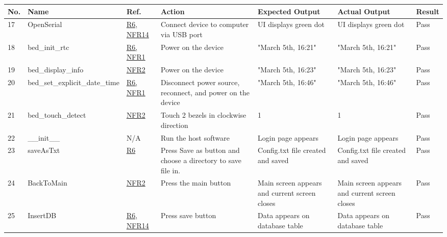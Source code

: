 \documentclass[12pt, titlepage]{article}
\begin{document}
\begin{center}
\begin{table} [H]
\begin{tabular}{ | p{0.5cm} | p{2.8cm} |  p{1.1cm} | p{2.7cm} | p{2.7cm} | p{2.7cm} | p{1.1cm} |}
\hline
\textbf{No.} & \textbf{Name}  & \textbf{Ref.} & \textbf{Action} & \textbf{Expected Output} & \textbf{Actual \newline Output} & \textbf{Result} \\
\hline
17 & OpenSerial & \href{https://github.com/zakerl/Capstone_Project/blob/main/docs/SRS/SRS.pdf}{R6, NFR14} & Connect device to computer via USB port & UI displays green dot & UI displays green dot & Pass \\ 
\hline
18 & bed\_init\_rtc & \href{https://github.com/zakerl/Capstone_Project/blob/main/docs/SRS/SRS.pdf}{R6, NFR1} & Power on the device & "March 5th, 16:21" & "March 5th, 16:21" & Pass \\ 
\hline
19 & bed\_display\_info & \href{https://github.com/zakerl/Capstone_Project/blob/main/docs/SRS/SRS.pdf}{NFR2} & Power on the device & "March 5th, 16:23" & "March 5th, 16:23" & Pass \\ 
\hline
20 & bed\_set\newline \_explicit\_date\newline \_time & \href{https://github.com/zakerl/Capstone_Project/blob/main/docs/SRS/SRS.pdf}{R6, NFR1} & Disconnect power source, reconnect, and power on the device & "March 5th, 16:46" & "March 5th, 16:46" & Pass \\ 
\hline
21 & bed\_touch\newline \_detect & \href{https://github.com/zakerl/Capstone_Project/blob/main/docs/SRS/SRS.pdf}{NFR2} & Touch 2 bezels in clockwise direction & 1 & 1 & Pass \\ 
\hline
22 & \_\_init\_\_ & N/A & Run the host software & Login page appears & Login page appears & Pass \\ 
\hline
23 & saveAsTxt & \href{https://github.com/zakerl/Capstone_Project/blob/main/docs/SRS/SRS.pdf}{R6} & Press Save as button and choose a directory to save file in. & Config.txt file created and saved & Config.txt file created and saved & Pass \\ 
\hline
24 & BackToMain & \href{https://github.com/zakerl/Capstone_Project/blob/main/docs/SRS/SRS.pdf}{NFR2} & Press the main button & Main screen appears and current screen closes & Main screen appears and current screen closes & Pass \\ 
\hline
25 &  InsertDB & \href{https://github.com/zakerl/Capstone_Project/blob/main/docs/SRS/SRS.pdf}{R6, NFR14} & Press save button & Data appears on database table & Data appears on database table & Pass \\ 

\end{tabular}
\end{table}
\end{center}
\end{document}

